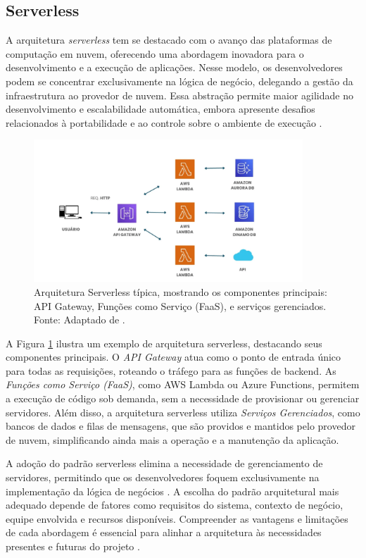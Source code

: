 \subsection{Serverless}
A arquitetura \textit{serverless} tem se destacado com o avanço das plataformas de computação em nuvem, oferecendo uma abordagem inovadora para o desenvolvimento e a execução de aplicações. Nesse modelo, os desenvolvedores podem se concentrar exclusivamente na lógica de negócio, delegando a gestão da infraestrutura ao provedor de nuvem. Essa abstração permite maior agilidade no desenvolvimento e escalabilidade automática, embora apresente desafios relacionados à portabilidade e ao controle sobre o ambiente de execução \cite{shekhar2023microservices}.

\begin{figure}[H]
\centering
\includegraphics[width=0.9\textwidth]{images/serverless.png}
\caption{Arquitetura Serverless típica, mostrando os componentes principais: API Gateway, Funções como Serviço (FaaS), e serviços gerenciados. Fonte: Adaptado de \cite{shekhar2023microservices}.}
\label{fig:serverless}
\end{figure}

A Figura \ref{fig:serverless} ilustra um exemplo de arquitetura serverless, destacando seus componentes principais. O \textit{API Gateway} atua como o ponto de entrada único para todas as requisições, roteando o tráfego para as funções de backend. As \textit{Funções como Serviço (FaaS)}, como AWS Lambda ou Azure Functions, permitem a execução de código sob demanda, sem a necessidade de provisionar ou gerenciar servidores. Além disso, a arquitetura serverless utiliza \textit{Serviços Gerenciados}, como bancos de dados e filas de mensagens, que são providos e mantidos pelo provedor de nuvem, simplificando ainda mais a operação e a manutenção da aplicação.

A adoção do padrão serverless elimina a necessidade de gerenciamento de servidores, permitindo que os desenvolvedores foquem exclusivamente na implementação da lógica de negócios \cite{shekhar2023microservices}. A escolha do padrão arquitetural mais adequado depende de fatores como requisitos do sistema, contexto de negócio, equipe envolvida e recursos disponíveis. Compreender as vantagens e limitações de cada abordagem é essencial para alinhar a arquitetura às necessidades presentes e futuras do projeto \cite{jamshidi2016systematic, nizami2020comparison}.

